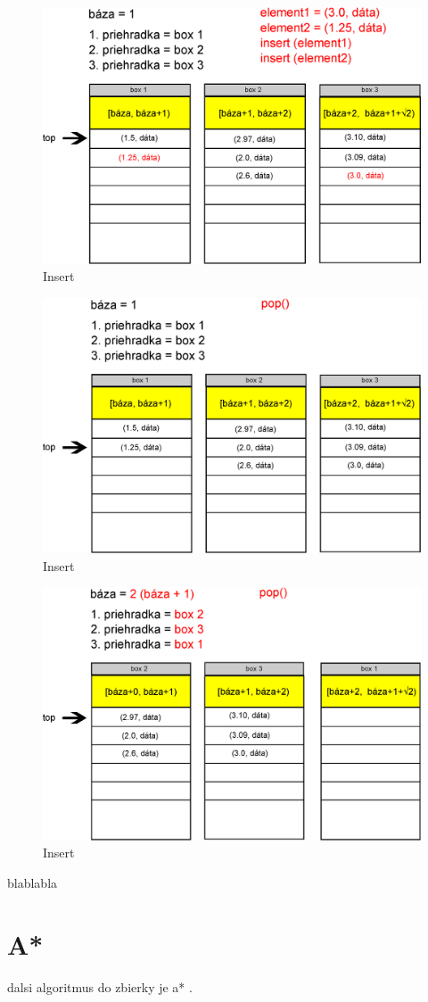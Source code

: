 \begin{figure}[h]
\centering
\includegraphics[width=\textwidth]{./img/priehradky_naplnene_default_i.eps}
\caption{Insert}
\label{fig:priehradky_i}
\end{figure}

\begin{figure}[h]
\centering
\includegraphics[width=\textwidth]{./img/priehradky_naplnene_default_i_d1.eps}
\caption{Insert}
\label{fig:priehradky_i_d1}
\end{figure}

\begin{figure}[h]
\centering
\includegraphics[width=\textwidth]{./img/priehradky_naplnene_default_i_d2.eps}
\caption{Insert}
\label{fig:priehradky_i_d2}
\end{figure}

blablabla


\section{A*}
dalsi algoritmus do zbierky je a* \cite{astar72}.
